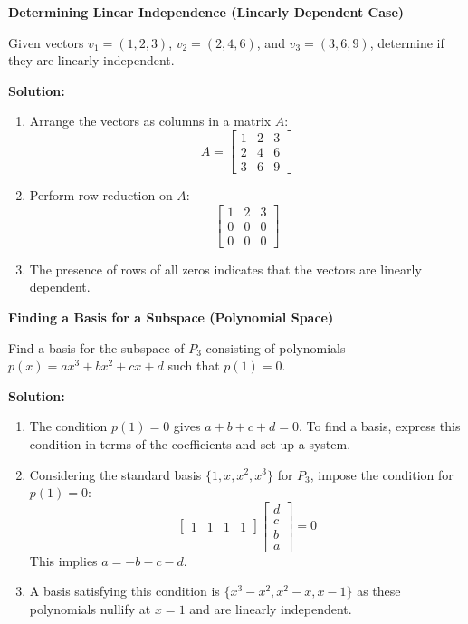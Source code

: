 \documentclass[8pt, a4paper, landscape]{extarticle}
\begin{document}
\begin{multicols*}{5}
  \textbf{Determining Linear Independence (Linearly Dependent Case)}

  Given vectors $v_1 = (1, 2, 3)$, $v_2 = (2, 4, 6)$, and $v_3 = (3, 6, 9)$, determine if they are linearly independent.

  \textbf{Solution:}
  \begin{enumerate}
    \item Arrange the vectors as columns in a matrix $A$:
          \[
            A = \begin{bmatrix}
              1 & 2 & 3 \\
              2 & 4 & 6 \\
              3 & 6 & 9
            \end{bmatrix}
          \]
    \item Perform row reduction on $A$:
          \[
            \begin{bmatrix}
              1 & 2 & 3 \\
              0 & 0 & 0 \\
              0 & 0 & 0
            \end{bmatrix}
          \]
    \item The presence of rows of all zeros indicates that the vectors are linearly dependent.
  \end{enumerate}

  \textbf{Finding a Basis for a Subspace (Polynomial Space)}

  Find a basis for the subspace of $P_3$ consisting of polynomials $p(x) = ax^3 + bx^2 + cx + d$ such that $p(1) = 0$.

  \textbf{Solution:}
  \begin{enumerate}
    \item The condition $p(1) = 0$ gives $a + b + c + d = 0$. To find a basis, express this condition in terms of the coefficients and set up a system.
    \item Considering the standard basis $\{1, x, x^2, x^3\}$ for $P_3$, impose the condition for $p(1) = 0$:
          \[
            \begin{bmatrix}
              1 & 1 & 1 & 1
            \end{bmatrix}
            \begin{bmatrix}
              d \\
              c \\
              b \\
              a
            \end{bmatrix}
            = 0
          \]
          This implies $a = -b - c - d$.
    \item A basis satisfying this condition is $\{x^3 - x^2, x^2 - x, x - 1\}$ as these polynomials nullify at $x = 1$ and are linearly independent.
  \end{enumerate}


\end{multicols*}
\end{document}
